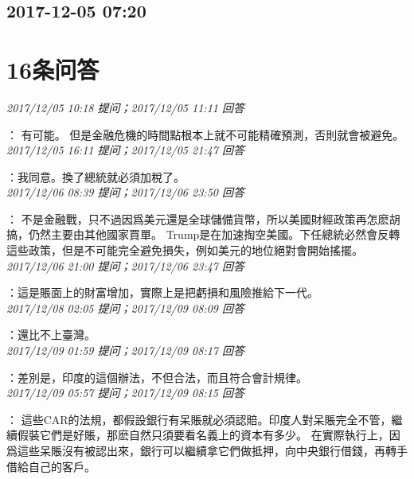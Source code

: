 \documentclass[twocolumn]{ctexart}
\begin{document}
\subsection{2017-12-05 07:20}


\section{16条问答}

\textit{\hfill\noindent\small 2017/12/05 10:18 提问；2017/12/05 11:11 回答}

：
有可能。
但是金融危機的時間點根本上就不可能精確預測，否則就會被避免。
\\

\textit{\hfill\noindent\small 2017/12/05 16:11 提问；2017/12/05 21:47 回答}

：我同意。換了總統就必須加稅了。
\\

\textit{\hfill\noindent\small 2017/12/06 08:39 提问；2017/12/06 23:50 回答}

：
不是金融戰，只不過因爲美元還是全球儲備貨幣，所以美國財經政策再怎麽胡搞，仍然主要由其他國家買單。
Trump是在加速掏空美國。下任總統必然會反轉這些政策，但是不可能完全避免損失，例如美元的地位絕對會開始搖擺。
\\

\textit{\hfill\noindent\small 2017/12/06 21:00 提问；2017/12/06 23:47 回答}

：這是賬面上的財富增加，實際上是把虧損和風險推給下一代。
\\

\textit{\hfill\noindent\small 2017/12/08 02:05 提问；2017/12/09 08:09 回答}

：還比不上臺灣。
\\

\textit{\hfill\noindent\small 2017/12/09 01:59 提问；2017/12/09 08:17 回答}

：差別是，印度的這個辦法，不但合法，而且符合會計規律。
\\

\textit{\hfill\noindent\small 2017/12/09 05:57 提问；2017/12/09 08:15 回答}

：
這些CAR的法規，都假設銀行有呆賬就必須認賠。印度人對呆賬完全不管，繼續假裝它們是好賬，那麽自然只須要看名義上的資本有多少。
在實際執行上，因爲這些呆賬沒有被認出來，銀行可以繼續拿它們做抵押，向中央銀行借錢，再轉手借給自己的客戶。
\\
\end{document}
